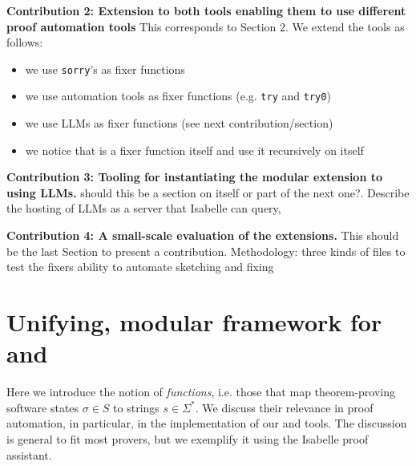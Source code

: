 \documentclass[10pt,conference]{IEEEtran}
\begin{document}
\medskip\noindent\textbf{Contribution 2: Extension to both tools enabling them to use different proof automation tools }
This corresponds to Section 2. We extend the tools as follows:
\begin{itemize}
    \item we use \texttt{sorry}'s as fixer functions
    \item we use automation tools as fixer functions (e.g. \texttt{try} and \texttt{try0})
    \item we use LLMs as fixer functions (see next contribution/section)
    \item we notice that \supersketch{} is a fixer function itself and use it recursively on itself
\end{itemize}

\medskip\noindent\textbf{Contribution 3: Tooling for instantiating the modular extension to using LLMs.}
should this be a section on itself or part of  the next one?. Describe the hosting of LLMs as a server that Isabelle can query, 

\medskip\noindent\textbf{Contribution 4: A small-scale evaluation of the extensions.}
This should be the last Section to present a contribution. 
Methodology: three kinds of files to test the fixers ability to automate sketching and fixing


\section{Unifying, modular framework for \supersketch{} and \superfix{}}
\label{sec:frame}

Here we introduce the notion of \emph{\frameterm functions}, i.e. those that map theorem-proving software states $\sigma\in S$ to strings $s\in\Sigma^*$. We discuss their relevance in proof automation, in particular, in the implementation of our \supersketch{} and \superfix{} tools. The discussion is general to fit most provers, but we exemplify it using the Isabelle proof assistant.
\end{document}
